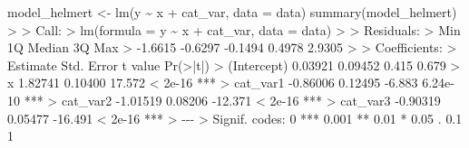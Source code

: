 \documentclass[
  letterpaper,
]{book}
\newenvironment{Shaded}{\begin{snugshade}}{\end{snugshade}}
\newcommand{\AttributeTok}[1]{\textcolor[rgb]{0.40,0.45,0.13}{#1}}
\newcommand{\DecValTok}[1]{\textcolor[rgb]{0.68,0.00,0.00}{#1}}
\newcommand{\ErrorTok}[1]{\textcolor[rgb]{0.68,0.00,0.00}{#1}}
\newcommand{\FloatTok}[1]{\textcolor[rgb]{0.68,0.00,0.00}{#1}}
\newcommand{\FunctionTok}[1]{\textcolor[rgb]{0.28,0.35,0.67}{#1}}
\newcommand{\NormalTok}[1]{\textcolor[rgb]{0.00,0.23,0.31}{#1}}
\newcommand{\OtherTok}[1]{\textcolor[rgb]{0.00,0.23,0.31}{#1}}
\newcommand{\SpecialCharTok}[1]{\textcolor[rgb]{0.37,0.37,0.37}{#1}}
\newcommand{\StringTok}[1]{\textcolor[rgb]{0.13,0.47,0.30}{#1}}
\begin{document}
\begin{Shaded}
\begin{Highlighting}[]
\NormalTok{model\_helmert }\OtherTok{\textless{}{-}} \FunctionTok{lm}\NormalTok{(y }\SpecialCharTok{\textasciitilde{}}\NormalTok{ x }\SpecialCharTok{+}\NormalTok{ cat\_var, }\AttributeTok{data =}\NormalTok{ data)}
\FunctionTok{summary}\NormalTok{(model\_helmert)}
\SpecialCharTok{\textgreater{}} 
\ErrorTok{\textgreater{}}\NormalTok{ Call}\SpecialCharTok{:}
\ErrorTok{\textgreater{}} \FunctionTok{lm}\NormalTok{(}\AttributeTok{formula =}\NormalTok{ y }\SpecialCharTok{\textasciitilde{}}\NormalTok{ x }\SpecialCharTok{+}\NormalTok{ cat\_var, }\AttributeTok{data =}\NormalTok{ data)}
\SpecialCharTok{\textgreater{}} 
\ErrorTok{\textgreater{}}\NormalTok{ Residuals}\SpecialCharTok{:}
\ErrorTok{\textgreater{}}\NormalTok{     Min      }\DecValTok{1}\NormalTok{Q  Median      }\DecValTok{3}\NormalTok{Q     Max }
\SpecialCharTok{\textgreater{}} \SpecialCharTok{{-}}\FloatTok{1.6615} \SpecialCharTok{{-}}\FloatTok{0.6297} \SpecialCharTok{{-}}\FloatTok{0.1494}  \FloatTok{0.4978}  \FloatTok{2.9305} 
\SpecialCharTok{\textgreater{}} 
\ErrorTok{\textgreater{}}\NormalTok{ Coefficients}\SpecialCharTok{:}
\ErrorTok{\textgreater{}}\NormalTok{             Estimate Std. Error t value }\FunctionTok{Pr}\NormalTok{(}\SpecialCharTok{\textgreater{}}\ErrorTok{|}\NormalTok{t}\SpecialCharTok{|}\NormalTok{)    }
\SpecialCharTok{\textgreater{}}\NormalTok{ (Intercept)  }\FloatTok{0.03921}    \FloatTok{0.09452}   \FloatTok{0.415}    \FloatTok{0.679}    
\SpecialCharTok{\textgreater{}}\NormalTok{ x            }\FloatTok{1.82741}    \FloatTok{0.10400}  \FloatTok{17.572}  \SpecialCharTok{\textless{}} \FloatTok{2e{-}16} \SpecialCharTok{**}\ErrorTok{*}
\ErrorTok{\textgreater{}}\NormalTok{ cat\_var1    }\SpecialCharTok{{-}}\FloatTok{0.86006}    \FloatTok{0.12495}  \SpecialCharTok{{-}}\FloatTok{6.883} \FloatTok{6.24e{-}10} \SpecialCharTok{**}\ErrorTok{*}
\ErrorTok{\textgreater{}}\NormalTok{ cat\_var2    }\SpecialCharTok{{-}}\FloatTok{1.01519}    \FloatTok{0.08206} \SpecialCharTok{{-}}\FloatTok{12.371}  \SpecialCharTok{\textless{}} \FloatTok{2e{-}16} \SpecialCharTok{**}\ErrorTok{*}
\ErrorTok{\textgreater{}}\NormalTok{ cat\_var3    }\SpecialCharTok{{-}}\FloatTok{0.90319}    \FloatTok{0.05477} \SpecialCharTok{{-}}\FloatTok{16.491}  \SpecialCharTok{\textless{}} \FloatTok{2e{-}16} \SpecialCharTok{**}\ErrorTok{*}
\ErrorTok{\textgreater{}} \SpecialCharTok{{-}{-}{-}}
\ErrorTok{\textgreater{}}\NormalTok{ Signif. codes}\SpecialCharTok{:}  \DecValTok{0} \StringTok{\textquotesingle{}***\textquotesingle{}} \FloatTok{0.001} \StringTok{\textquotesingle{}**\textquotesingle{}} \FloatTok{0.01} \StringTok{\textquotesingle{}*\textquotesingle{}} \FloatTok{0.05} \StringTok{\textquotesingle{}.\textquotesingle{}} \FloatTok{0.1} \StringTok{\textquotesingle{} \textquotesingle{}} \DecValTok{1}

\end{Highlighting}
\end{Shaded}
\end{document}
